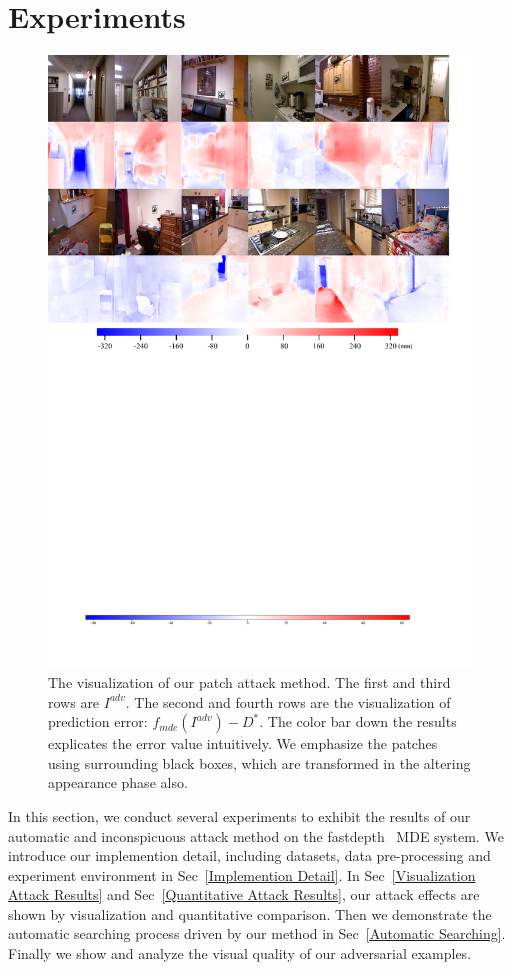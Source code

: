\documentclass[10pt,twocolumn,letterpaper]{article}
\begin{document}
\section{Experiments}
\begin{figure}[htb]
	\includegraphics[width=1\textwidth]{imgs/results.pdf}
	\caption{The visualization of our patch attack
	method. The first and third rows are $I^{adv}$.
	The second and fourth rows are the visualization
	of prediction error: 
	$f_{mde}(I^{adv}) - D^{*}$.
	The color bar down the results explicates the 
	error value intuitively.
	We emphasize the patches using surrounding 
	black boxes, which are transformed in the 
	altering appearance phase also.}
	\label{results}
\end{figure}
In this section, we conduct several experiments to exhibit 
the results of our automatic and inconspicuous attack
method on the fastdepth~\cite{Wofk_2019_ICRA} MDE system. 
We introduce our implemention detail, including datasets,
data pre-processing and experiment environment in
Sec~\ref{Implemention Detail}.
In Sec~\ref{Visualization Attack Results} and 
Sec~\ref{Quantitative Attack Results}, 
our attack effects are shown by visualization
and quantitative comparison.
Then we demonstrate the automatic searching process driven 
by our method in Sec~\ref{Automatic Searching}. Finally we
show and analyze the visual quality of our adversarial examples. 
\end{document}
